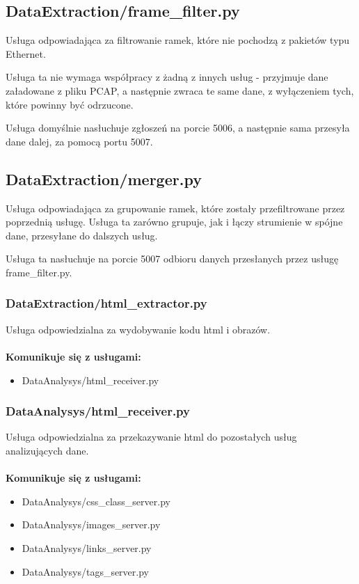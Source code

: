 \documentclass[12pt]{article}
\begin{document}
\subsection{DataExtraction/frame\_filter.py}
Usługa odpowiadająca za filtrowanie ramek, które nie pochodzą z pakietów typu Ethernet.

Usługa ta nie wymaga współpracy z żadną z innych usług - przyjmuje dane załadowane z pliku PCAP, a następnie zwraca te same dane, z wyłączeniem tych, które powinny być odrzucone. 

Usługa domyślnie nasłuchuje zgłoszeń na porcie 5006, a następnie sama przesyła dane dalej, za pomocą portu 5007.

\subsection{DataExtraction/merger.py}
Usługa odpowiadająca za grupowanie ramek, które zostały przefiltrowane przez poprzednią usługę. Usługa ta zarówno grupuje, jak i łączy strumienie w spójne dane, przesyłane do dalszych usług.

Usługa ta nasłuchuje na porcie 5007 odbioru danych przesłanych przez usługę frame\_filter.py.

\subsubsection{DataExtraction/html\_extractor.py} 
Usługa odpowiedzialna za wydobywanie kodu html i obrazów.
\mbox{}\\\\
\textbf{Komunikuje się z usługami:}\\
\begin{itemize}
\item DataAnalysys/html\_receiver.py
\end{itemize} 

\subsubsection{DataAnalysys/html\_receiver.py} 
Usługa odpowiedzialna za przekazywanie html do pozostałych usług analizujących dane.
\mbox{}\\\\
\textbf{Komunikuje się z usługami:}\\
\begin{itemize}
\item DataAnalysys/css\_class\_server.py
\item DataAnalysys/images\_server.py
\item DataAnalysys/links\_server.py
\item DataAnalysys/tags\_server.py
\end{itemize} 
\end{document}
